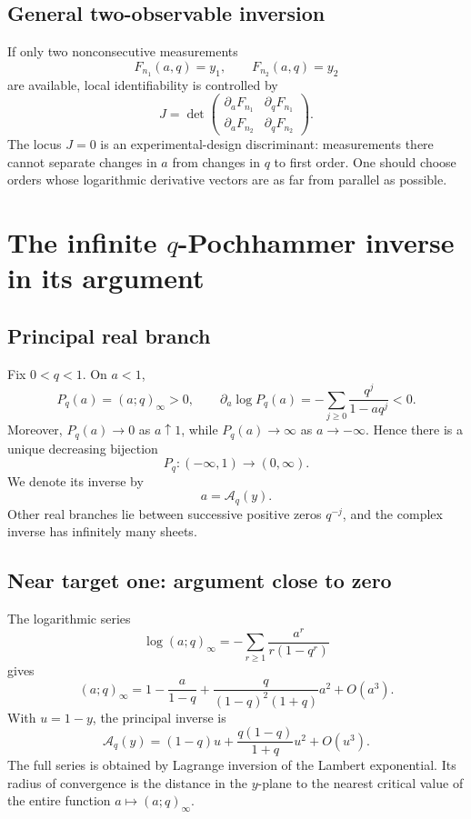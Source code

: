 \documentclass[11pt,letterpaper,oneside,openany]{book}
\theoremstyle{definition}
\theoremstyle{remark}
\newcommand{\Aq}{\mathcal A_q}
\begin{document}
\section{General two-observable inversion}
If only two nonconsecutive measurements
\[
 F_{n_1}(a,q)=y_1,
 \qquad F_{n_2}(a,q)=y_2
\]
are available, local identifiability is controlled by
\[
 J=\det\begin{pmatrix}
 \partial_aF_{n_1}&\partial_qF_{n_1}\\
 \partial_aF_{n_2}&\partial_qF_{n_2}
 \end{pmatrix}.
\]
The locus \(J=0\) is an experimental-design discriminant: measurements there
cannot separate changes in \(a\) from changes in \(q\) to first order.  One
should choose orders whose logarithmic derivative vectors are as far from
parallel as possible.

\chapter{The infinite \texorpdfstring{\(q\)}{q}-Pochhammer inverse in its argument}

\section{Principal real branch}
Fix \(0<q<1\).  On \(a<1\),
\[
 P_q(a)=(a;q)_\infty>0,
 \qquad
 \partial_a\log P_q(a)=-\sum_{j\ge0}\frac{q^j}{1-aq^j}<0.
\]
Moreover, \(P_q(a)\to0\) as \(a\uparrow1\), while
\(P_q(a)\to\infty\) as \(a\to-\infty\).  Hence there is a unique decreasing
bijection
\[
 P_q:(-\infty,1)\longrightarrow(0,\infty).
\]
We denote its inverse by
\[
 a=\Aq(y).
\]
Other real branches lie between successive positive zeros \(q^{-j}\), and the
complex inverse has infinitely many sheets.

\section{Near target one: argument close to zero}
The logarithmic series
\[
 \log(a;q)_\infty=-\sum_{r\ge1}\frac{a^r}{r(1-q^r)}
\]
gives
\[
 (a;q)_\infty
 =1-\frac{a}{1-q}
 +\frac{q}{(1-q)^2(1+q)}a^2+O(a^3).
\]
With \(u=1-y\), the principal inverse is
\begin{equation}\label{eq:infinite-argument-near-one}
 \Aq(y)=(1-q)u+\frac{q(1-q)}{1+q}u^2+O(u^3).
\end{equation}
The full series is obtained by Lagrange inversion of the Lambert exponential.
Its radius of convergence is the distance in the \(y\)-plane to the nearest
critical value of the entire function \(a\mapsto(a;q)_\infty\).
\end{document}
